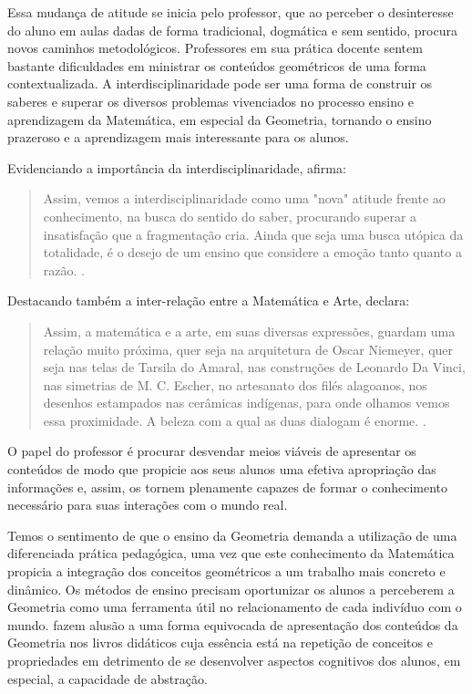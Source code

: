 \begin{refsection}
    Essa mudança de atitude se inicia pelo professor, que ao perceber o desinteresse do aluno em aulas dadas de forma tradicional, dogmática e sem sentido, procura novos caminhos metodológicos. Professores em sua prática docente sentem bastante dificuldades em ministrar os conteúdos geométricos de uma forma contextualizada. A interdisciplinaridade pode ser uma forma de construir os saberes e superar os diversos problemas vivenciados no processo ensino e aprendizagem da Matemática, em especial da Geometria, tornando o ensino prazeroso e a aprendizagem mais interessante para os alunos. 

    Evidenciando a importância da interdisciplinaridade, \textcite{ALVES2008Interdisciplinaridade} afirma: 

    \begin{quotation}
        Assim, vemos a interdisciplinaridade como uma "nova" atitude frente ao conhecimento, na busca do sentido do saber, procurando superar a insatisfação que a fragmentação cria. Ainda que seja uma busca utópica da totalidade, é o desejo de um ensino que considere a emoção tanto quanto a razão. \cite[p.~100]{ALVES2008Interdisciplinaridade}.
    \end{quotation}


    Destacando também a inter-relação entre a Matemática e Arte, \textcite{ALBUQUERQUE2017Geometria} declara: 

    \begin{quotation}
        Assim, a matemática e a arte, em suas diversas expressões, guardam uma relação muito próxima, quer seja na arquitetura de Oscar Niemeyer, quer seja nas telas de Tarsila do Amaral, nas construções de Leonardo Da Vinci, nas simetrias de M. C. Escher, no artesanato dos filés alagoanos, nos desenhos estampados nas cerâmicas indígenas, para onde olhamos vemos essa proximidade. A beleza com a qual as duas dialogam é enorme. \cite[p.~46]{ALBUQUERQUE2017Geometria}.
    \end{quotation}

    O papel do professor é procurar desvendar meios viáveis de apresentar os conteúdos de modo que propicie aos seus alunos uma efetiva apropriação das informações e, assim, os tornem plenamente capazes de formar o conhecimento necessário para suas interações com o mundo real.  

    Temos o sentimento de que o ensino da Geometria demanda a utilização de uma diferenciada prática pedagógica, uma vez que este conhecimento da Matemática propicia a integração dos conceitos geométricos a um trabalho mais concreto e dinâmico. Os métodos de ensino precisam oportunizar os alunos a perceberem a Geometria como uma ferramenta útil no relacionamento de cada indivíduo com o mundo. \textcite{CONTIEROAndGRAVINA2011Modelagem} fazem alusão a uma forma equivocada de apresentação dos conteúdos da Geometria nos livros didáticos cuja essência está na repetição de conceitos e propriedades em detrimento de se desenvolver aspectos cognitivos dos alunos, em especial, a capacidade de abstração.  


\end{refsection}
